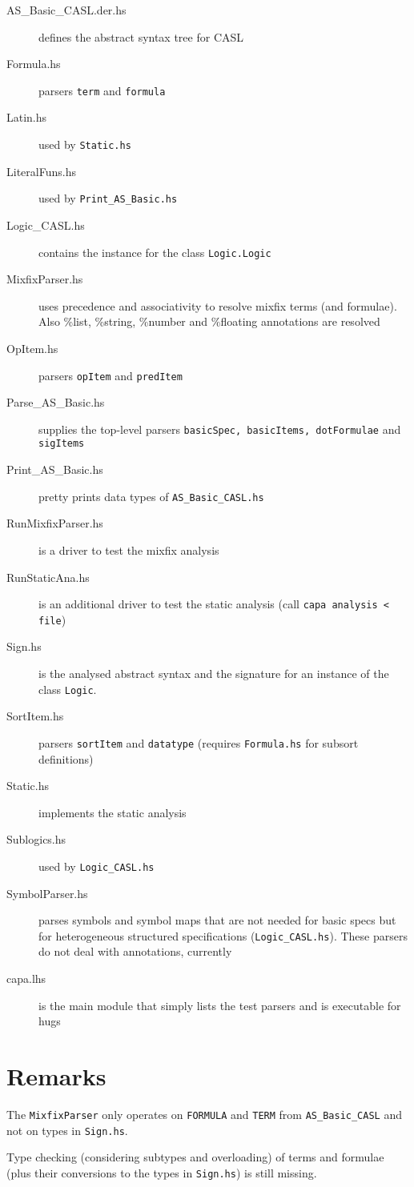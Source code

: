 \documentclass{article}
\begin{document}
\begin{description}
\item[AS\_Basic\_CASL.der.hs] defines the abstract syntax tree for CASL
\item[Formula.hs] parsers \texttt{term} and \texttt{formula}
\item[Latin.hs] used by \texttt{Static.hs}
\item[LiteralFuns.hs] used by \texttt{Print\_AS\_Basic.hs}
\item[Logic\_CASL.hs] contains the instance for the class \texttt{Logic.Logic}
\item[MixfixParser.hs] uses precedence and associativity to resolve
  mixfix terms (and formulae). Also \%list, \%string, \%number and
  \%floating annotations are resolved 
\item[OpItem.hs] parsers \texttt{opItem} and \texttt{predItem}
\item[Parse\_AS\_Basic.hs] supplies the top-level parsers \texttt{basicSpec,
  basicItems, dotFormulae} and \texttt{sigItems}
\item[Print\_AS\_Basic.hs] pretty prints data types of
  \texttt{AS\_Basic\_CASL.hs}
\item[RunMixfixParser.hs] is a driver to test the mixfix
  analysis
\item[RunStaticAna.hs] is an additional driver to test the static 
  analysis (call \texttt{capa analysis < file})  
\item[Sign.hs] is the analysed abstract syntax and the signature for an
  instance of the class \texttt{Logic}.
\item[SortItem.hs] parsers \texttt{sortItem} and \texttt{datatype} (requires
  \texttt{Formula.hs} for subsort definitions)
\item[Static.hs] implements the static analysis
\item[Sublogics.hs] used by \texttt{Logic\_CASL.hs}
\item[SymbolParser.hs] parses symbols and symbol maps that are not needed for
  basic specs but for heterogeneous structured specifications
  (\texttt{Logic\_CASL.hs}). These parsers do not deal with annotations,
  currently
\item[capa.lhs] is the main module that simply lists the test parsers
  and is executable for hugs
\end{description}


\section{Remarks}

The \texttt{MixfixParser} only operates on \texttt{FORMULA} and
\texttt{TERM} from \texttt{AS\_Basic\_CASL} and not on
types in \texttt{Sign.hs}. 

Type checking (considering subtypes and overloading) of terms and
formulae (plus their conversions to the types in \texttt{Sign.hs}) is
still missing.
\end{document}
